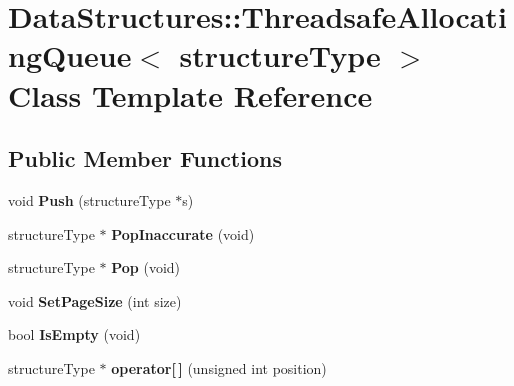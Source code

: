 \hypertarget{class_data_structures_1_1_threadsafe_allocating_queue}{\section{Data\-Structures\-:\-:Threadsafe\-Allocating\-Queue$<$ structure\-Type $>$ Class Template Reference}
\label{class_data_structures_1_1_threadsafe_allocating_queue}
}
\subsection*{Public Member Functions}
\begin{DoxyCompactItemize}
\item 
\hypertarget{class_data_structures_1_1_threadsafe_allocating_queue_a768320d1f04005713d0d94bd3b5a7f43}{void {\bfseries Push} (structure\-Type $\ast$s)}\label{class_data_structures_1_1_threadsafe_allocating_queue_a768320d1f04005713d0d94bd3b5a7f43}

\item 
\hypertarget{class_data_structures_1_1_threadsafe_allocating_queue_aad86452e470ac42bbfe656aed0b192a2}{structure\-Type $\ast$ {\bfseries Pop\-Inaccurate} (void)}\label{class_data_structures_1_1_threadsafe_allocating_queue_aad86452e470ac42bbfe656aed0b192a2}

\item 
\hypertarget{class_data_structures_1_1_threadsafe_allocating_queue_aeaee4f85f6aa6870a2eb57c533ba13f5}{structure\-Type $\ast$ {\bfseries Pop} (void)}\label{class_data_structures_1_1_threadsafe_allocating_queue_aeaee4f85f6aa6870a2eb57c533ba13f5}

\item 
\hypertarget{class_data_structures_1_1_threadsafe_allocating_queue_a833da782723daa209092fa29b29fbc94}{void {\bfseries Set\-Page\-Size} (int size)}\label{class_data_structures_1_1_threadsafe_allocating_queue_a833da782723daa209092fa29b29fbc94}

\item 
\hypertarget{class_data_structures_1_1_threadsafe_allocating_queue_a0e9dcb3ab5bb94af7535c41468a233c0}{bool {\bfseries Is\-Empty} (void)}\label{class_data_structures_1_1_threadsafe_allocating_queue_a0e9dcb3ab5bb94af7535c41468a233c0}

\item 
\hypertarget{class_data_structures_1_1_threadsafe_allocating_queue_aeffe0642e5cea2431c976415955a1460}{structure\-Type $\ast$ {\bfseries operator\mbox{[}$\,$\mbox{]}} (unsigned int position)}\label{class_data_structures_1_1_threadsafe_allocating_queue_aeffe0642e5cea2431c976415955a1460}


\end{DoxyCompactItemize}
